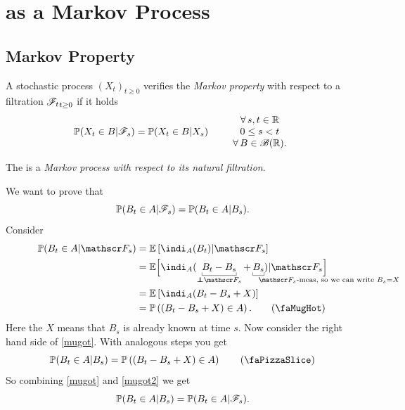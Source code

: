 \documentclass[12pt]{report}
\begin{document}
\section{\bwm{} as a Markov Process}
\subsection{Markov Property}
\begin{definition}
	A stochastic process ${(X_{t})}_{t\geq0}$ verifies the \emph{Markov property} with respect to a filtration ${\mathscr{F}_{t}}_{t\geq 0}$ if it holds
	\begin{equation*}
		\mathbb{P}(X_{t}\in B|\mathscr{F}_{s})=\mathbb{P}(X_{t}\in B|X_{s})\qquad\begin{array}{c}
			\forall\, s,t\in\mathbb{R}\\
			0\leq s<t\\
			\forall\, B\in\mathscr{B}(\mathbb{R}).
		\end{array}
	\end{equation*}
\end{definition}
\begin{theorem}
	The \bwm{} is a \emph{Markov process with respect to its natural filtration}.
\end{theorem}
\begin{fancyproof}
	We want to prove that 
	\begin{equation*}
		\mathbb{P}(B_{t}\in A|\mathscr{F}_{s})=\mathbb{P}(B_{t}\in A|B_{s}).
	\end{equation*}
	Consider 
	\begin{align*}
		\pr(B_{t}\in A|\F_{s})&=\evs\left[\indi_{A}(B_{t})|\F_{s}\right]\\
		&=\evs\Bigl[\indi_{A}(\ubracketthin{B_{t}-B_{s}}_{\independent\F_{s}}+\ubracketthin{B_{s}}_{\mathrlap{\text{$\F_{s}$-meas, so we can write }B_{s}=X}})|\F_{s}\Bigr]\\
		&=\evs\left[\indi_{A}(B_{t}-B_{s}+X)\right]\\
		&=\pr\left(\left(B_{t}-B_{s}+X\right)\in A\right).\tag{\faMugHot}\label{mugot}
	\end{align*}
	Here the $X$ means that $B_{s}$ is already known at time $s$. Now consider the right hand side of \ref{mugot}. With analogous steps you get
	\begin{equation*}
		\pr(B_{t}\in A|B_{s})=\pr\left(\left(B_{t}-B_{s}+X\right)\in A\right)\tag{\faPizzaSlice}\label{mugot2}
	\end{equation*}
	So combining \ref{mugot} and \ref{mugot2} we get
	\begin{equation*}
		\mathbb{P}(B_{t}\in A|B_{s})=\mathbb{P}(B_{t}\in A|\mathscr{F}_{s}).
	\end{equation*}
\end{fancyproof}
\end{document}
